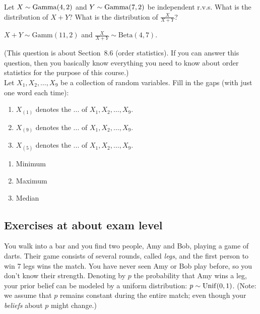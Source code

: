 \documentclass[assignments]{subfiles}
\begin{document}
\begin{exercise}
Let $X \sim \mathrm{Gamma}(4,2)$ and $Y \sim \mathrm{Gamma}(7,2)$ be independent r.v.s. What is the distribution of $X+Y$? What is the distribution of $\frac{X}{X+Y}$?

\begin{solution}
$X+Y \sim \text{Gamm}(11,2)$ and $\frac{X}{X+Y} \sim \text{Beta}(4,7)$.
\end{solution}
\end{exercise}





\begin{exercise}
(This question is about Section~8.6 (order statistics). If you can answer this question, then you basically know everything you need to know about order statistics for the purpose of this course.)\\
Let $X_1,X_2,\ldots,X_9$ be a collection of random variables. Fill in the gaps (with just one word each time):
\begin{enumerate}
    \item $X_{(1)}$ denotes the ... of $X_1,X_2,\ldots,X_9$.
    \item $X_{(9)}$ denotes the ... of $X_1,X_2,\ldots,X_9$.
    \item $X_{(5)}$ denotes the ... of $X_1,X_2,\ldots,X_9$.
\end{enumerate}
\begin{solution}
\begin{enumerate}
    \item Minimum
    \item Maximum
    \item Median
\end{enumerate}
\end{solution}
\end{exercise}

\subsection{Exercises at about exam level}


You walk into a bar and you find two people, Amy and Bob, playing a game of darts. Their game consists of several rounds, called \textit{legs}, and the first person to win 7 legs wins the match. You have never seen Amy or Bob play before, so you don't know their strength. Denoting by $p$ the probability that Amy wins a leg, your prior belief can be modeled by a uniform distribution: $p \sim \mathrm{Unif}(0,1)$.  (Note: we assume that $p$ remains constant during the entire match; even though your \textit{beliefs} about $p$ might change.)
\end{document}

